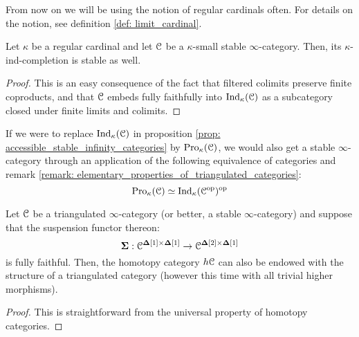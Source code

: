                 \begin{remark}
                    From now on we will be using the notion of regular cardinals often. For details on the notion, see definition \ref{def: limit_cardinal}.
                \end{remark}
                
                \begin{proposition} \label{prop: accessible_stable_infinity_categories}  
                    Let $\kappa$ be a regular cardinal and let $\mathcal{C}$ be a $\kappa$-small stable $\infty$-category. Then, its $\kappa$-ind-completion is stable as well.
                \end{proposition}
                    \begin{proof}
                        This is an easy consequence of the fact that filtered colimits preserve finite coproducts, and that $\mathcal{C}$ embeds fully faithfully into $\mathrm{Ind}_{\kappa}(\mathcal{C})$ as a subcategory closed under finite limits and colimits. 
                    \end{proof}
                \begin{remark}  
                    If we were to replace $\mathrm{Ind}_{\kappa}(\mathcal{C})$ in proposition \ref{prop: accessible_stable_infinity_categories} by $\mathrm{Pro}_{\kappa}(\mathcal{C})$, we would also get a stable $\infty$-category through an application of the following equivalence of categories and remark \ref{remark: elementary_properties_of_triangulated_categories}:
                        $$\mathrm{Pro}_{\kappa}(\mathcal{C}) \simeq \mathrm{Ind}_{\kappa}(\mathcal{C}^{\mathrm{op}})^{\mathrm{op}}$$
                \end{remark}
                
                \begin{proposition} \label{prop: homotopy_category_of_triangulated_categories} 
                    Let $\mathcal{C}$ be a triangulated $\infty$-category (or better, a stable $\infty$-category) and suppose that the suspension functor thereon:
                        $$\suspension: \C^{\simp[1] \x \simp[1]} \to \C^{\simp[2] \x \simp[1]}$$
                    is fully faithful. Then, the homotopy category $h\mathcal{C}$ can also be endowed with the structure of a triangulated category (however this time with all trivial higher morphisms).
                \end{proposition}
                    \begin{proof}
                        This is straightforward from the universal property of homotopy categories. 
                    \end{proof}
                    
